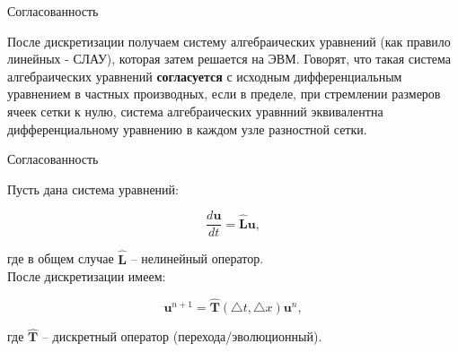 \documentclass[10pt,xcolor=pst,aspectratio=169]{beamer}
\begin{document}
%
%
%

\begin{frame}{Согласованность}

	\transdissolve[duration=0.1]
	\justifying
	\large

	После дискретизации получаем систему алгебраических уравнений (как правило линейных - СЛАУ), которая затем решается на ЭВМ. Говорят, что такая система алгебраических уравнений \textbf{согласуется} с исходным дифференциальным уравнением в частных производных, если в пределе, при стремлении размеров ячеек сетки к нулю, система алгебраических уравнний эквивалентна дифференциальному уравнению в каждом  узле разностной сетки.

\end{frame}

\begin{frame}{Согласованность}

	\transdissolve[duration=0.1]
	\justifying
	\large

	Пусть дана система уравнений:

    \[
        \frac{d \textbf{u}}{d t} = \hat{\textbf{L}} \textbf{u},
    \]

	
	где в общем случае $\hat{\textbf{L}}$ -- нелинейный оператор.\\

	После дискретизации имеем:

    \[
        \textbf{u}^{n + 1} = \hat{\textbf{T}} (\triangle t, \triangle x) \textbf{u}^{n},
    \]


	где $\hat{\textbf{T}}$ -- дискретный оператор (перехода/эволюционный).

\end{frame}
\end{document}
